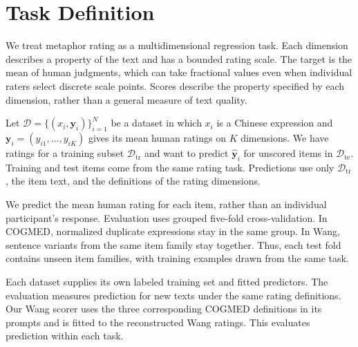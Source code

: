 \section{Task Definition}

We treat metaphor rating as a multidimensional regression task. Each dimension describes a property of the text and has a bounded rating scale. The target is the mean of human judgments, which can take fractional values even when individual raters select discrete scale points. Scores describe the property specified by each dimension, rather than a general measure of text quality.

Let $\mathcal{D}=\{(x_i,\mathbf{y}_i)\}_{i=1}^{N}$ be a dataset in which $x_i$ is a Chinese expression and $\mathbf{y}_i=(y_{i1},\ldots,y_{iK})$ gives its mean human ratings on $K$ dimensions. We have ratings for a training subset $\mathcal{D}_{\mathrm{tr}}$ and want to predict $\hat{\mathbf{y}}_i$ for unscored items in $\mathcal{D}_{\mathrm{te}}$. Training and test items come from the same rating task. Predictions use only $\mathcal{D}_{\mathrm{tr}}$, the item text, and the definitions of the rating dimensions.

We predict the mean human rating for each item, rather than an individual participant's response. Evaluation uses grouped five-fold cross-validation. In COGMED, normalized duplicate expressions stay in the same group. In Wang, sentence variants from the same item family stay together. Thus, each test fold contains unseen item families, with training examples drawn from the same task.

Each dataset supplies its own labeled training set and fitted predictors. The evaluation measures prediction for new texts under the same rating definitions. Our Wang scorer uses the three corresponding COGMED definitions in its prompts and is fitted to the reconstructed Wang ratings. This evaluates prediction within each task.